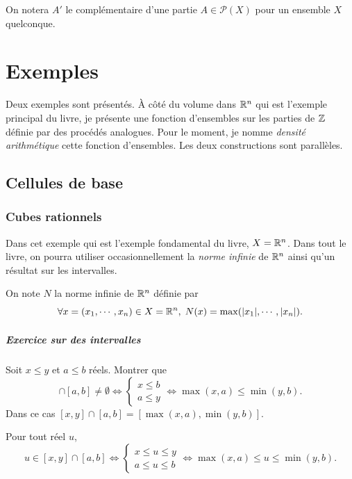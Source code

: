 On notera $A'$ le complémentaire d'une partie $A \in \mathcal{P}(X)$ pour un ensemble $X$ quelconque.
\newpage

\chapter{Exemples}\label{Chap:Exples}
Deux exemples sont présentés. À côté du volume dans $\mathbb{R}^n$ qui est l'exemple principal du livre, je présente une fonction d'ensembles sur les parties de $\mathbb{Z}$ définie par des procédés analogues. Pour le moment, je nomme \emph{densité arithmétique} cette fonction d'ensembles. Les deux constructions sont parallèles.

\section{Cellules de base}\label{Sec:CellulesBases}

\subsection{Cubes rationnels}\label{SubSec:CubesRat}
Dans cet exemple qui est l'exemple fondamental du livre, $X=\mathbb{R}^n$. Dans tout le livre, on pourra utiliser occasionnellement la \emph{norme infinie} de $\mathbb{R}^n$ ainsi qu'un résultat sur les intervalles. 
\begin{defi}
 On note $N$ la norme infinie de $\mathbb{R}^n$ définie par
 \begin{displaymath}
  \forall x=(x_1,\cdots,x_n)\in X= \mathbb{R}^n, \; N(x)=\max(|x_1|,\cdots,|x_n|).
 \end{displaymath}
\end{defi}

 \paragraph{Exercice sur des intervalles} \label{ExoIntervalles}
 Soit $x\leq y$ et $a\leq b$ réels. Montrer que
 \begin{displaymath}
  [x,y] \cap [a,b] \neq \emptyset
  \Leftrightarrow
  \left\lbrace
  \begin{aligned}
    x \leq b \\
    a \leq y
  \end{aligned}
  \right.
  \Leftrightarrow \max(x,a)\leq \min(y,b).
 \end{displaymath}
 Dans ce cas $[x,y]\cap [a,b] = [\max(x,a),\min(y,b)]$.
\begin{demo}
Pour tout réel $u$,
\begin{displaymath}
 u \in [x,y] \cap [a,b]
 \Leftrightarrow
 \left\lbrace
 \begin{aligned}
   x \leq u \leq y \\
   a \leq u \leq b
 \end{aligned}
 \right.
 \Leftrightarrow
   \max(x,a) \leq u \leq \min(y,b) .
 \end{displaymath}
\end{demo}

